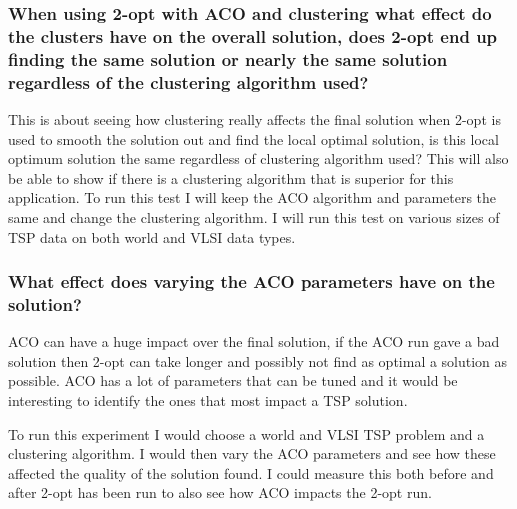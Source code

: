 \subsubsection{When using 2-opt with ACO and clustering what effect do the clusters have on the overall solution, does 2-opt end up finding the same solution or nearly the same solution regardless of the clustering algorithm used?}

This is about seeing how clustering really affects the final solution when 2-opt is used to smooth the solution out and find the local optimal solution, is this local optimum solution the same regardless of clustering algorithm used? This will also be able to show if there is a clustering algorithm that is superior for this application. To run this test I will keep the ACO algorithm and parameters the same and change the clustering algorithm. I will run this test on various sizes of TSP data on both world and VLSI data types. 

\subsubsection{What effect does varying the ACO parameters have on the solution?}

ACO can have a huge impact over the final solution, if the ACO run gave a bad solution then 2-opt can take longer and possibly not find as optimal a solution as possible. ACO has a lot of parameters that can be tuned and it would be interesting to identify the ones that most impact a TSP solution.

To run this experiment I would choose a world and VLSI TSP problem and a clustering algorithm. I would then vary the ACO parameters and see how these affected the quality of the solution found. I could measure this both before and after 2-opt has been run to also see how ACO impacts the 2-opt run.